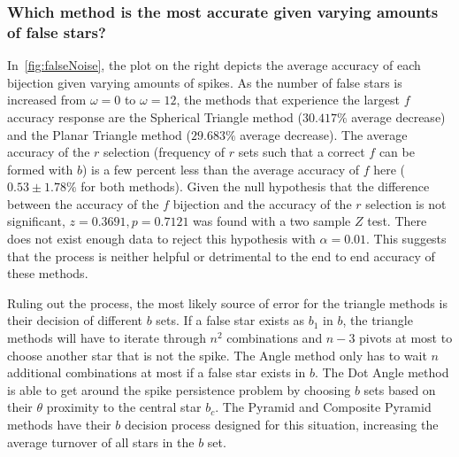 \subsubsection{Which method is the most accurate given varying amounts of false stars?}
%
%
%
%
In~\autoref{fig:falseNoise}, the plot on the right depicts the average accuracy of each bijection given varying amounts
of spikes.
As the number of false stars is increased from $\omega = 0$ to $\omega = 12$, the methods that experience the largest
$f$ accuracy response are the Spherical Triangle method ($30.417\%$ average decrease) and the Planar Triangle method
($29.683\%$ average decrease).
The average accuracy of the $r$ selection (frequency of $r$ sets such that a correct $f$ can be formed with $b$) is
a few percent less than the average accuracy of $f$ here ($0.53 \pm 1.78\%$ for both methods).
Given the null hypothesis that the difference between the accuracy of the $f$ bijection and the accuracy of the $r$
selection is not significant, $z = 0.3691, p = 0.7121$ was found with a two sample $Z$ test.
There does not exist enough data to reject this hypothesis with $\alpha = 0.01$.
This suggests that the  process is neither helpful or detrimental to the end to end accuracy of these
methods.

Ruling out the  process, the most likely source of error for the triangle methods is their decision of
different $b$ sets.
If a false star exists as $b_1$ in $b$, the triangle methods will have to iterate through $n^2$ combinations and $n - 3$
pivots at most to choose another star that is not the spike.
The Angle method only has to wait $n$ additional combinations at most if a false star exists in $b$.
The Dot Angle method is able to get around the spike persistence problem by choosing $b$ sets based on their $\theta$
proximity to the central star $b_c$.
The Pyramid and Composite Pyramid methods have their $b$ decision process designed for this situation, increasing the
average turnover of all stars in the $b$ set.

